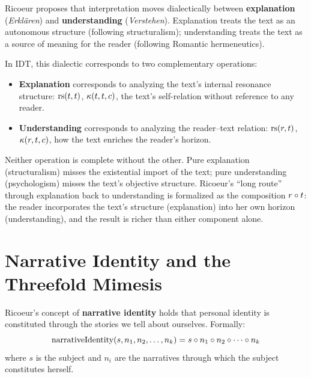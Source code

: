 \begin{interpretation}
\label{interp:ricoeur-dialectic}
Ricoeur proposes that interpretation moves dialectically between
\textbf{explanation} (\textit{Erkl\"aren}) and \textbf{understanding}
(\textit{Verstehen}).  Explanation treats the text as an autonomous
structure (following structuralism); understanding treats the text as a
source of meaning for the reader (following Romantic hermeneutics).

In IDT, this dialectic corresponds to two complementary operations:

\begin{itemize}
\item \textbf{Explanation} corresponds to analyzing the text's internal
resonance structure: $\mathrm{rs}(t, t)$, $\kappa(t, t, c)$, the text's
self-relation without reference to any reader.

\item \textbf{Understanding} corresponds to analyzing the reader--text
relation: $\mathrm{rs}(r, t)$, $\kappa(r, t, c)$, how the text enriches
the reader's horizon.
\end{itemize}

Neither operation is complete without the other.  Pure explanation
(structuralism) misses the existential import of the text; pure understanding
(psychologism) misses the text's objective structure.  Ricoeur's ``long route''
through explanation back to understanding is formalized as the composition
$r \circ t$: the reader incorporates the text's structure (explanation)
into her own horizon (understanding), and the result is richer than either
component alone.
\end{interpretation}

\section{Narrative Identity and the Threefold Mimesis}

\begin{definition}
\label{def:narrative-identity-ricoeur}
Ricoeur's concept of \textbf{narrative identity} holds that personal identity
is constituted through the stories we tell about ourselves.  Formally:
\[
\mathrm{narrativeIdentity}(s, n_1, n_2, \ldots, n_k) = s \circ n_1 \circ n_2 \circ \cdots \circ n_k
\]
where $s$ is the subject and $n_i$ are the narratives through which the
subject constitutes herself.
\end{definition}

